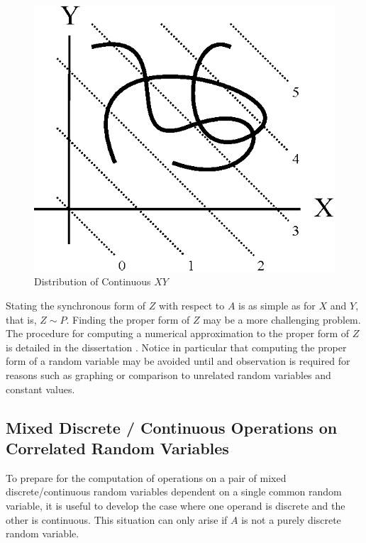 \begin{figure}
  \centering
  \includegraphics{Images/XY_continous.eps}
  \caption[Joint distribution of correlated Continuous $X$ and $Y$ in $XY$-space]
          {Distribution of Continuous $XY$}
  \label{fig:XY_continous}
\end{figure}

Stating the synchronous form of $Z$ with respect to $A$ is as simple as for $X$ and $Y$, that is, $Z \sim P$. Finding the proper form of $Z$ may be a more challenging problem. The procedure for computing a numerical approximation to the proper form of $Z$ is detailed in the dissertation \cite{fielden12}. Notice in particular that computing the proper form of a random variable may be avoided until and observation is required for reasons such as graphing or comparison to unrelated random variables and constant values.

\subsection{Mixed Discrete / Continuous Operations on Correlated Random Variables}

To prepare for the computation of operations on a pair of mixed discrete/continuous random variables dependent on a single common random variable, it is useful to develop the case where one operand is discrete and the other is continuous. This situation can only arise if $A$ is not a purely discrete random variable.

